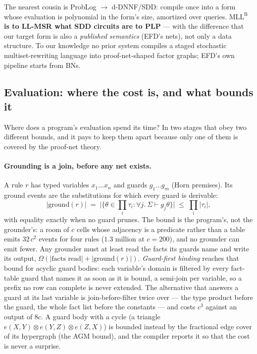 \documentclass[11pt]{article}
\newcommand{\tensor}{\otimes}
\newcommand{\mllb}{\mathrm{MLL}^{\mathrm B}}
\theoremstyle{plain}
\theoremstyle{definition}
\theoremstyle{remark}
\begin{document}
The nearest cousin is ProbLog $\to$ d-DNNF/SDD: compile once into a
form whose evaluation is polynomial in the form's size, amortized over
queries. \textbf{$\mllb$ is to LL-MSR what SDD circuits are to PLP} ---
with the difference that our target form is also a \emph{published
semantics} (EFD's nets), not only a data structure. To our knowledge no
prior system compiles a staged stochastic multiset-rewriting language
into proof-net-shaped factor graphs; EFD's own pipeline starts from
BNs.

\subsection{Evaluation: where the cost is, and what bounds it}
\label{sec:evaluation}

Where does a program's evaluation spend its time? In two stages that
obey two different bounds, and it pays to keep them apart because only
one of them is covered by the proof-net theory.

\paragraph{Grounding is a join, before any net exists.} A rule $r$ has
typed variables $x_1 \ldots x_n$ and guards $g_1 \ldots g_m$ (Horn
premises). Its ground events are the substitutions for which every
guard is derivable:
\[
  |\mathrm{ground}(r)| \;=\; \big|\{\theta \in \textstyle\prod_i \tau_i
  : \forall j.\ \Sigma \vdash g_j\theta\}\big| \;\le\; \prod_i |\tau_i|,
\]
with equality exactly when no guard prunes. The bound is the program's,
not the grounder's: a room of $c$ cells whose adjacency is a predicate
rather than a table emits $32\,c^2$ events for four rules ($1.3$
million at $c = 200$), and no grounder can emit fewer. Any grounder must
at least read the facts its guards name and write its output,
$\Omega(|\text{facts read}| + |\mathrm{ground}(r)|)$. \emph{Guard-first
binding} reaches that bound for acyclic guard bodies: each variable's
domain is filtered by every fact-table guard that names it as soon as
it is bound, a semi-join per variable, so a prefix no row can complete is
never extended. The alternative that answers a guard at its last
variable is join-before-filter twice over --- the type product before the
guard, the whole fact list before the constants --- and costs $c^3$
against an output of $8c$. A guard body with a cycle (a triangle
$e(X,Y) \tensor e(Y,Z) \tensor e(Z,X)$) is bounded instead by the
fractional edge cover of its hypergraph (the AGM bound), and the
compiler reports it so that the cost is never a surprise.
\end{document}
